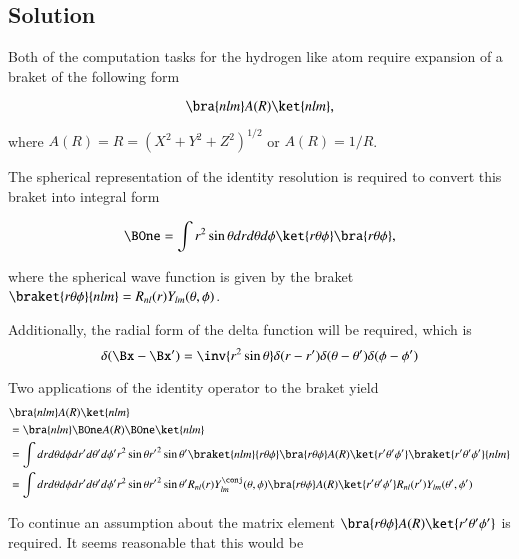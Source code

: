 \subsection{Solution}

Both of the computation tasks for the hydrogen like atom require expansion of a braket of the following form

\begin{equation}\label{eqn:qmIproblemSet4:200}
\bra{nlm} A(R) \ket{nlm},
\end{equation}

where $A(R) = R = (X^2 + Y^2 + Z^2)^{1/2}$ or $A(R) = 1/R$.

The spherical representation of the identity resolution is required to convert this braket into integral form

\begin{equation}\label{eqn:qmIproblemSet4:202}
\BOne = \int r^2 \sin\theta dr d\theta d\phi 
\ket{ r \theta \phi}
\bra{ r \theta \phi},
\end{equation}

where the spherical wave function is given by the braket $\braket{ r \theta \phi}{nlm} = R_{nl}(r) Y_{lm}(\theta,\phi)$.

Additionally, the radial form of the delta function will be required, which is
\begin{equation}\label{eqn:qmIproblemSet4:204}
\delta(\Bx - \Bx') = \inv{r^2 \sin\theta} \delta(r - r') \delta(\theta - \theta') \delta(\phi - \phi')
\end{equation}

Two applications of the identity operator to the braket yield
\begin{align*}
&\bra{nlm} A(R) \ket{nlm} \\
&=\bra{nlm} \BOne A(R) \BOne \ket{nlm} \\
&=
\int 
dr d\theta d\phi 
dr' d\theta' d\phi'
r^2 \sin\theta 
{r'}^2 \sin\theta' 
\braket{nlm}{ r \theta \phi}
\bra{ r \theta \phi} A(R) 
\ket{ r' \theta' \phi'}
\braket{ r' \theta' \phi'}{nlm} \\
&=
\int 
dr d\theta d\phi 
dr' d\theta' d\phi'
r^2 \sin\theta 
{r'}^2 \sin\theta' 
R_{nl}(r) Y_{lm}^\conj(\theta, \phi)
\bra{ r \theta \phi} A(R) \ket{ r' \theta' \phi'}
R_{nl}(r') Y_{lm}(\theta', \phi') \\
\end{align*}

To continue an assumption about the matrix element $\bra{ r \theta \phi} A(R) \ket{ r' \theta' \phi'}$ is required.  It seems reasonable that this would be

